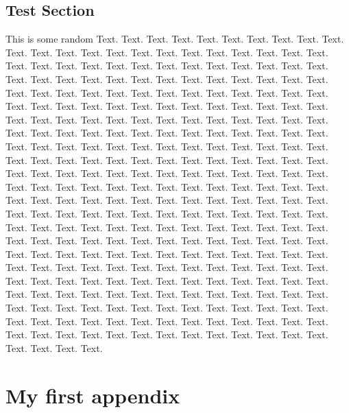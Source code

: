 \documentclass{book}
\begin{document}
\section{Test Section}
This is some random Text. Text. Text. Text. Text. Text. Text. Text. Text. Text. Text. Text. Text. Text. Text. Text. Text. Text. Text. Text. Text. Text. Text. Text. Text. Text. Text. Text. Text. Text. Text. Text. Text. Text. Text. Text. Text. Text. Text. Text. Text. Text. Text. Text. Text. Text. Text. Text. Text. Text. Text. Text. Text. Text. Text. Text. Text. Text. Text. Text. Text. Text. Text. Text. Text. Text. Text. Text. Text. Text. Text. Text. Text. Text. Text. Text. Text. Text. Text. Text. Text. Text. Text. Text. Text. Text. Text. Text. Text. Text. Text. Text. Text. Text. Text. Text. Text. Text. Text. Text. Text. Text. Text. Text. Text. Text. Text. Text. Text. Text. Text. Text. Text. Text. Text. Text. Text. Text. Text. Text. Text. Text. Text. Text. Text. Text. Text. Text. Text. Text. Text. Text. Text. Text. Text. Text. Text. Text. Text. Text. Text. Text. Text. Text. Text. Text. Text. Text. Text. Text. Text. Text. Text. Text. Text. Text. Text. Text. Text. Text. Text. Text. Text. Text. Text. Text. Text. Text. Text. Text. Text. Text. Text. Text. Text. Text. Text. Text. Text. Text. Text. Text. Text. Text. Text. Text. Text. Text. Text. Text. Text. Text. Text. Text. Text. Text. Text. Text. Text. Text. Text. Text. Text. Text. Text. Text. Text. Text. Text. Text. Text. Text. Text. Text. Text. Text. Text. Text. Text. Text. Text. Text. Text. Text. Text. Text. Text. Text. Text. Text. Text. Text. Text. Text. Text. Text. Text. Text. Text. Text. Text. Text. Text. Text. Text. Text. Text. Text. Text. Text. Text. Text. Text. Text. Text. Text. Text. Text. Text. Text. Text. Text. Text. Text. Text. Text. Text. Text. Text. Text. Text. Text. Text. Text. Text. Text. Text. Text. Text. Text. Text. Text. Text. Text. Text. Text. Text. Text. Text. Text. Text. Text. Text. Text. Text. Text. Text. Text. Text. Text.

\appendix

\chapter{My first appendix}
\end{document}
